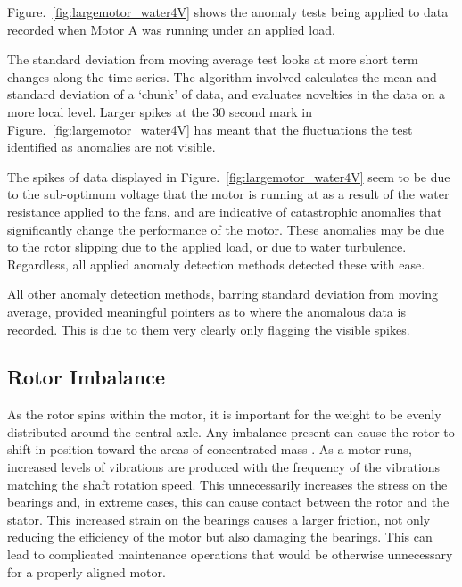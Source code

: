 Figure.~\ref{fig:largemotor_water4V} shows the anomaly tests being applied to data recorded when Motor A was running under an applied load.

The standard deviation from moving average test looks at more short term changes along the time series. The algorithm involved calculates the mean and standard deviation of a `chunk' of data, and evaluates novelties in the data on a more local level. Larger spikes at the 30 second mark in Figure.~\ref{fig:largemotor_water4V} has meant that the fluctuations the test identified as anomalies are not visible.

The spikes of data displayed in Figure.~\ref{fig:largemotor_water4V} seem to be due to the sub-optimum voltage that the motor is running at as a result of the water resistance applied to the fans, and are indicative of catastrophic anomalies that significantly change the performance of the motor. These anomalies may be due to the rotor slipping due to the applied load, or due to water turbulence. Regardless, all applied anomaly detection methods detected these with ease.

All other anomaly detection methods, barring standard deviation from moving average, provided meaningful pointers as to where the anomalous data is recorded. This is due to them very clearly only flagging the visible spikes.



\subsection{Rotor Imbalance}
As the rotor spins within the motor, it is important for the weight to be evenly distributed around the central axle. Any imbalance present can cause the rotor to shift in position toward the areas of concentrated mass \cite{xu1994vibration}. As a motor runs, increased levels of vibrations are produced with the frequency of the vibrations matching the shaft rotation speed. This unnecessarily increases the stress on the bearings and, in extreme cases, this can cause contact between the rotor and the stator. This increased strain on the bearings causes a larger friction, not only reducing the efficiency of the motor but also damaging the bearings. This can lead to complicated maintenance operations that would be otherwise unnecessary for a properly aligned motor.

